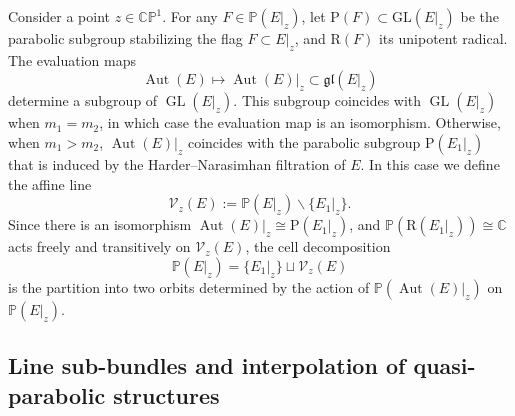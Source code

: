 \documentclass[pdftex]{sigma}
\newcommand{\field}[1]{\ensuremath{\mathbb{#1}}}
\newcommand{\CC}{\field{C}}
\newcommand{\PP}{\field{P}}
\newcommand{\curly}[1]{\mathscr{#1}}
\newcommand{\cV}{\curly{V}}
\DeclareMathOperator{\Aut}{Aut}
\DeclareMathOperator{\GL}{GL}
\numberwithin{equation}{section}
\begin{document}
Consider a point $z\in\CC\PP^{1}$. For any $F\in\PP(E\vert_{z})$, let $\mathrm{P}(F)\subset\mathrm{GL}(E\vert_{z})$ be the parabolic subgroup stabilizing the flag $F\subset E\vert_{z}$, and $\mathrm{R}(F)$ its unipotent radical. The evaluation maps
\[
\Aut(E)\mapsto \Aut(E)\vert_{z}\subset \mathfrak{gl}(E\vert_{z})
\]
determine a subgroup of $\GL(E|_{z})$. This subgroup coincides with $\GL(E\vert_{z})$ when $m_{1} = m_{2}$, in which case the evaluation map is an isomorphism. Otherwise, when $m_{1} > m_{2}$, $\Aut(E)\vert_{z}$ coincides with the parabolic subgroup $\mathrm{P}(E_{1}\vert_{z})$ that is induced by the Harder--Narasimhan filtration of $E$.
In this case we define the affine line
\[
\cV_{z}(E) := \PP(E\vert_{z})\backslash\{E_{1}\vert_{z}\}.
\]
Since there is an isomorphism
$\Aut(E)|_{z} \cong \mathrm{P}(E_{1}\vert_{z})$,
and $\PP(\mathrm{R}(E_{1}\vert_{z}))\cong \CC$ acts freely and transitively on $\cV_{z}(E)$, the cell decomposition
\[
\PP(E\vert_{z}) = \{E_{1}\vert_{z}\}\sqcup\cV_{z}(E)
\]
is the partition into two orbits determined by the action of $\PP(\Aut(E)|_{z})$ on $\PP(E|_{z})$.

\subsection{Line sub-bundles and interpolation of quasi-parabolic structures}
\end{document}
